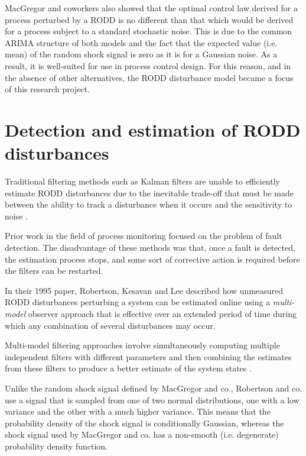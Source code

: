 MacGregor and coworkers also showed that the optimal control law derived for a process perturbed by a RODD is no different than that which would be derived for a process subject to a standard stochastic noise.  This is due to the common ARIMA structure of both models and the fact that the expected value (i.e. mean) of the random shock signal is zero as it is for a Gaussian noise. As a result, it is well-suited for use in process control design. For this reason, and in the absence of other alternatives, the RODD disturbance model became a focus of this research project.

\section*{Detection and estimation of RODD disturbances}\label{detection_RODDs}

Traditional filtering methods such as Kalman filters are unable to efficiently estimate RODD disturbances due to the inevitable trade-off that must be made between the ability to track a disturbance when it occurs and the sensitivity to noise \cite{robertson_detection_1995}.

Prior work in the field of process monitoring focused on the problem of fault detection. The disadvantage of these methods was that, once a fault is detected, the estimation process stops, and some sort of corrective action is required before the filters can be restarted. 

In their 1995 paper, Robertson, Kesavan and Lee \cite{robertson_detection_1995} described how unmeasured RODD disturbances perturbing a system can be estimated online using a \textit{multi-model} observer approach that is effective over an extended period of time during which any combination of several disturbances may occur.

Multi-model filtering approaches involve simultaneously computing multiple independent filters with different parameters and then combining the estimates from these filters to produce a better estimate of the system states \cite{jaffer_estimation_1971, buxbaum_recursive_1970, tugnait_detection_1982}.

Unlike the random shock signal defined by MacGregor and co., Robertson and co. use a signal that is sampled from one of two normal distributions, one with a low variance and the other with a much higher variance. This means that the probability density of the shock signal is conditionally Gaussian, whereas the shock signal used by MacGregor and co. has a non-smooth (i.e. degenerate) probability density function.


